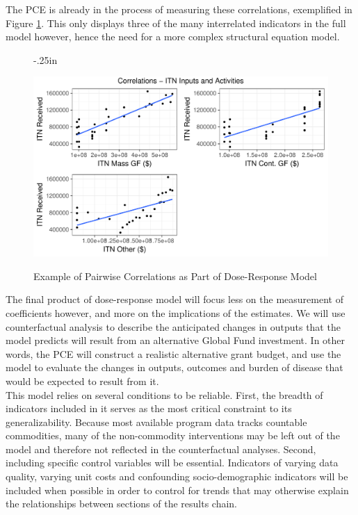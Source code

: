 \documentclass[twocolumn]{bmcart}%
\begin{document}
The PCE is already in the process of measuring these correlations, exemplified in Figure \ref{fig3}. This only displays three of the many interrelated indicators in the full model however, hence the need for a more complex structural equation model. \\

\begin{figure}[h]
  \advance\leftskip-.25in
  \caption{\textmd{Example of Pairwise Correlations as Part of Dose-Response Model}}
  \includegraphics[scale=.375]{Pages_from_pilot_data_exploratory_graphs.pdf} \\
  \label{fig3}
\end{figure}

The final product of dose-response model will focus less on the measurement of coefficients however, and more on the implications of the estimates. We will use counterfactual analysis to describe the anticipated changes in outputs that the model predicts will result from an alternative Global Fund investment. In other words, the PCE will construct a realistic alternative grant budget, and use the model to evaluate the changes in outputs, outcomes and burden of disease that would be expected to result from it. \\

This model relies on several conditions to be reliable. First, the breadth of indicators included in it serves as the most critical constraint to its generalizability. Because most available program data tracks countable commodities, many of the non-commodity interventions may be left out of the model and therefore not reflected in the counterfactual analyses. Second, including specific control variables will be essential. Indicators of varying data quality, varying unit costs and confounding socio-demographic indicators will be included when possible in order to control for trends that may otherwise explain the relationships between sections of the results chain.
\end{document}
